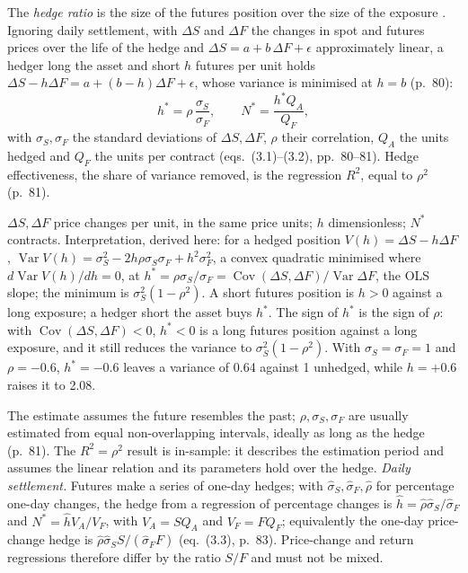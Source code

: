 \begin{qfmodel}\label{mod:minimum-variance-hedge-ratio}
 The \emph{hedge ratio} is the size of the futures position over the size of the exposure \citep[chap.~3, ``Hedging Strategies Using Futures'', sec.~3.4, p.~79]{s7-hulloptions}. Ignoring daily settlement, with $\Delta S$ and $\Delta F$ the changes in spot and futures prices over the life of the hedge and $\Delta S=a+b\,\Delta F+\epsilon$ approximately linear, a hedger long the asset and short $h$ futures per unit holds $\Delta S-h\Delta F=a+(b-h)\Delta F+\epsilon$, whose variance is minimised at $h=b$ (p.~80):
\[ h^*=\rho\,\frac{\sigma_S}{\sigma_F},\qquad N^*=\frac{h^*Q_A}{Q_F}, \]
with $\sigma_S,\sigma_F$ the standard deviations of $\Delta S,\Delta F$, $\rho$ their correlation, $Q_A$ the units hedged and $Q_F$ the units per contract (eqs.~(3.1)--(3.2), pp.~80--81). Hedge effectiveness, the share of variance removed, is the regression $R^2$, equal to $\rho^2$ (p.~81).

 $\Delta S,\Delta F$ price changes per unit, in the same price units; $h$ dimensionless; $N^*$ contracts. Interpretation, derived here: for a hedged position $V(h)=\Delta S-h\Delta F$, $\operatorname{Var}V(h)=\sigma_S^2-2h\rho\sigma_S\sigma_F+h^2\sigma_F^2$, a convex quadratic minimised where $d\operatorname{Var}V(h)/dh=0$, at $h^*=\rho\sigma_S/\sigma_F=\operatorname{Cov}(\Delta S,\Delta F)/\operatorname{Var}\Delta F$, the OLS slope; the minimum is $\sigma_S^2(1-\rho^2)$. A short futures position is $h>0$ against a long exposure; a hedger short the asset buys $h^*$. The sign of $h^*$ is the sign of $\rho$: with $\operatorname{Cov}(\Delta S,\Delta F)<0$, $h^*<0$ is a long futures position against a long exposure, and it still reduces the variance to $\sigma_S^2(1-\rho^2)$. With $\sigma_S=\sigma_F=1$ and $\rho=-0.6$, $h^*=-0.6$ leaves a variance of 0.64 against 1 unhedged, while $h=+0.6$ raises it to 2.08.

 The estimate assumes the future resembles the past; $\rho,\sigma_S,\sigma_F$ are usually estimated from equal non-overlapping intervals, ideally as long as the hedge (p.~81). The $R^2=\rho^2$ result is in-sample: it describes the estimation period and assumes the linear relation and its parameters hold over the hedge. \emph{Daily settlement.} Futures make a series of one-day hedges; with $\hat\sigma_S,\hat\sigma_F,\hat\rho$ for percentage one-day changes, the hedge from a regression of percentage changes is $\hat h=\hat\rho\hat\sigma_S/\hat\sigma_F$ and $N^*=\hat hV_A/V_F$, with $V_A=SQ_A$ and $V_F=FQ_F$; equivalently the one-day price-change hedge is $\hat\rho\hat\sigma_SS/(\hat\sigma_FF)$ (eq.~(3.3), p.~83). Price-change and return regressions therefore differ by the ratio $S/F$ and must not be mixed.


\end{qfmodel}
